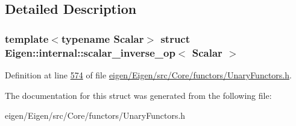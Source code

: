 \subsection{Detailed Description}
\subsubsection*{template$<$typename Scalar$>$\newline
struct Eigen\+::internal\+::scalar\+\_\+inverse\+\_\+op$<$ Scalar $>$}



Definition at line \hyperlink{eigen_2_eigen_2src_2_core_2functors_2_unary_functors_8h_source_l00574}{574} of file \hyperlink{eigen_2_eigen_2src_2_core_2functors_2_unary_functors_8h_source}{eigen/\+Eigen/src/\+Core/functors/\+Unary\+Functors.\+h}.



The documentation for this struct was generated from the following file\+:\begin{DoxyCompactItemize}
\item 
eigen/\+Eigen/src/\+Core/functors/\+Unary\+Functors.\+h\end{DoxyCompactItemize}
